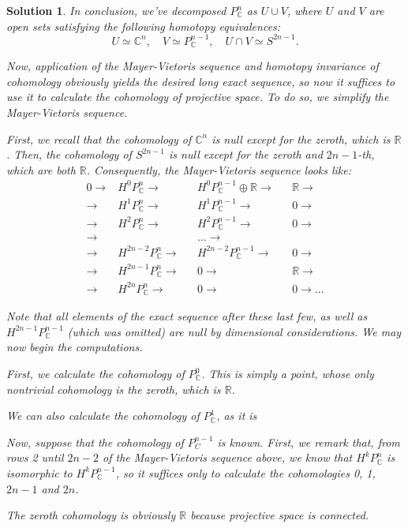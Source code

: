 \documentclass{article}
\theoremstyle{nonumberplain}
\newtheorem{sol}{Solution}
\newcommand{\R}{\mathbb{R}}
\newcommand{\C}{\mathbb{C}}
\begin{document}
\begin{sol}
In conclusion, we've decomposed $P^n_\C$ as $U \cup V$, where $U$ and $V$ are open sets satisfying the following homotopy equivalences:
\[U \simeq \C^n, \quad V \simeq P^{n-1}_\C, \quad U \cap V \simeq S^{2n-1}.\]

Now, application of the Mayer-Vietoris sequence and homotopy invariance of cohomology obviously yields the desired long exact sequence, so now it suffices to use it to calculate the cohomology of projective space. To do so, we simplify the Mayer-Vietoris sequence.

First, we recall that the cohomology of $\C^n$ is null except for the zeroth, which is $\R$. Then, the cohomology of $S^{2n-1}$ is null except for the zeroth and $2n-1$-th, which are both $\R$. Consequently, the Mayer-Vietoris sequence looks like:
\begin{align*}
0 \rightarrow &H^0 P^n_\C \rightarrow &&H^0 P^{n-1}_\C \oplus \R \rightarrow &&\R \rightarrow\\
\rightarrow &H^1 P^n_\C \rightarrow &&H^1 P^{n-1}_\C \rightarrow &&0 \rightarrow\\
\rightarrow &H^2 P^n_\C \rightarrow &&H^2  P^{n-1}_\C \rightarrow &&0 \rightarrow\\
\rightarrow &&&\dots \rightarrow&&\\
\rightarrow &H^{2n-2} P^n_\C \rightarrow &&H^{2n-2} P^{n-1}_\C \rightarrow &&0 \rightarrow\\
\rightarrow &H^{2n-1} P^n_\C \rightarrow &&0 \rightarrow &&\R \rightarrow\\
\rightarrow &H^{2n} P^n_\C \rightarrow &&0 \rightarrow &&0 \rightarrow \dots
\end{align*}

Note that all elements of the exact sequence after these last few, as well as $H^{2n-1} P^{n-1}_\C$ (which was omitted) are null by dimensional considerations. We may now begin the computations.

First, we calculate the cohomology of $P^0_\C$. This is simply a point, whose only nontrivial cohomology is the zeroth, which is $\R$.

We can also calculate the cohomology of $P^1_\C$, as it is 

Now, suppose that the cohomology of $P^{n-1}_C$ is known. First, we remark that, from rows 2 until $2n-2$ of the Mayer-Vietoris sequence above, we know that $H^k P^n_\C$ is isomorphic to $H^k P^{n-1}_\C$, so it suffices only to calculate the cohomologies 0, 1, $2n-1$ and $2n$.

The zeroth cohomology is obviously $\R$ because projective space is connected.


\end{sol}
\end{document}
